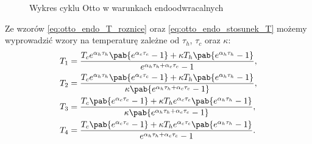 \begin{figure}[htp]
	\centering
	
	\caption{Wykres cyklu Otto w warunkach endoodwracalnych}
\end{figure}

Ze wzorów \eqref{eq:otto_endo_T_roznice} oraz \eqref{eq:otto_endo_stosunek_T} możemy wyprowadzić wzory na temperaturę zależne od \(\tau_h\), \(\tau_c\) oraz \(\kappa\):
\begin{equation}\label{eq:endo_otto_T}
	\begin{split}
		T_1 &= \frac{
			T_c e^{\alpha_h \tau_h} \pab{e^{\alpha_c \tau_c} - 1} + \kappa T_h \pab{e^{\alpha_h \tau_h} - 1}
		}{
			e^{\alpha_h \tau_h + \alpha_c \tau_c} - 1
		}, \\
		T_2 &= \frac{
			T_c e^{\alpha_h \tau_h} \pab{e^{\alpha_c \tau_c} - 1} + \kappa T_h \pab{e^{\alpha_h \tau_h} - 1}
		}{
			\kappa \pab{e^{\alpha_h \tau_h + \alpha_c \tau_c} - 1}
		}, \\
		T_3 &= \frac{
			T_c \pab{e^{\alpha_c \tau_c} - 1} + \kappa T_h e^{\alpha_c \tau_c} \pab{e^{\alpha_h \tau_h} - 1}
		}{
			\kappa \pab{e^{\alpha_h \tau_h + \alpha_c \tau_c} - 1}
		}, \\
		T_4 &= \frac{
			T_c \pab{e^{\alpha_c \tau_c} - 1} + \kappa T_h e^{\alpha_c \tau_c} \pab{e^{\alpha_h \tau_h} - 1}
		}{
			e^{\alpha_h \tau_h + \alpha_c \tau_c} - 1
		}.
	\end{split}
\end{equation}

